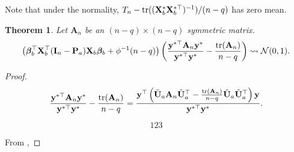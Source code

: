 \documentclass[11pt]{article}
\DeclareMathOperator{\mytr}{tr}
\newcommand{\By}{\mathbf{y}}    \newcommand{\Bz}{\mathbf{z}}
\newcommand{\BA}{\mathbf{A}}    \newcommand{\BB}{\mathbf{B}}    \newcommand{\BC}{\mathbf{C}}    \newcommand{\BD}{\mathbf{D}}    \newcommand{\BE}{\mathbf{E}}    \newcommand{\BF}{\mathbf{F}}    \newcommand{\BG}{\mathbf{G}}    \newcommand{\BH}{\mathbf{H}}    \newcommand{\BI}{\mathbf{I}}    \newcommand{\BJ}{\mathbf{J}}    \newcommand{\BK}{\mathbf{K}}    \newcommand{\BL}{\mathbf{L}}
\newcommand{\bfsym}[1]{\ensuremath{\boldsymbol{#1}}}
\def\bbeta{\bfsym \beta}
\theoremstyle{plain}
\newtheorem{theorem}{\quad\quad Theorem}
\theoremstyle{definition}
\theoremstyle{remark}
\begin{document}
Note that under the normality, $T_n- \mytr ((\BX_b^* \BX_b^{*\top})^{-1})/(n-q)$ has zero mean.

\begin{theorem}\label{generalTheorem}
    Let $\BA_n$ be an $(n-q)\times (n-q)$ symmetric matrix.
\begin{equation*}
    \left(
    \bbeta_b^\top \BX_b^\top (\BI_n-\BP_a) \BX_b \bbeta_b
    + \phi^{-1}(n-q)
\right)
    \left(
        \frac{\By^{*\top} \BA_n \By^*}{\By^{*\top} \By^*} -\frac{\mytr (\BA_n)}{n-q}
    \right)
    \rightsquigarrow \mathcal N(0,1).
\end{equation*}
\end{theorem}
\begin{proof}
    \begin{equation*}
        \frac{\By^{*\top} \BA_n \By^*}{\By^{*\top} \By^*} -\frac{\mytr (\BA_n)}{n-q}
        =
        \frac{\By^{\top}\left( \tilde{\BU}_a\BA_n \tilde{\BU}_a^\top
                -\frac{\mytr (\BA_n)}{n-q} \tilde{\BU}_a\tilde{\BU}_a^\top
        \right) \By}{\By^{*\top} \By^*}.
    \end{equation*}


\begin{equation*}
123 
\end{equation*}

    From \cite[Theorem 5.1]{jiang1996reml},
\end{proof}







\end{document}
